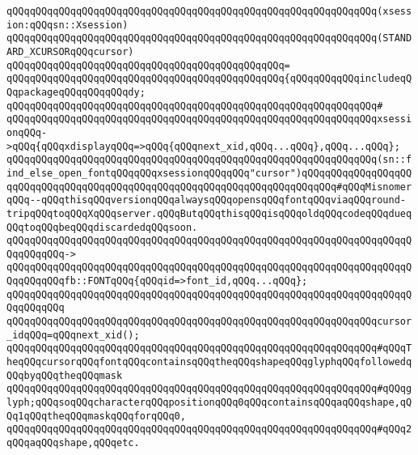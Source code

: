 \verb|qQQqqQQqqQQqqQQqqQQqqQQqqQQqqQQqqQQqqQQqqQQqqQQqqQQqqQQqqQQqqQQq(xsession:qQQqsn::Xsession)|\newline
\verb|qQQqqQQqqQQqqQQqqQQqqQQqqQQqqQQqqQQqqQQqqQQqqQQqqQQqqQQqqQQqqQQq(STANDARD_XCURSORqQQqcursor)|\newline
\verb|qQQqqQQqqQQqqQQqqQQqqQQqqQQqqQQqqQQqqQQqqQQqqQQq=|\newline
\verb|qQQqqQQqqQQqqQQqqQQqqQQqqQQqqQQqqQQqqQQqqQQqqQQq{qQQqqQQqqQQqincludeqQQqpackageqQQqqQQqqQQqdy;|\newline
\verb|qQQqqQQqqQQqqQQqqQQqqQQqqQQqqQQqqQQqqQQqqQQqqQQqqQQqqQQqqQQqqQQq#|\newline
\verb|qQQqqQQqqQQqqQQqqQQqqQQqqQQqqQQqqQQqqQQqqQQqqQQqqQQqqQQqqQQqqQQqxsessionqQQq->qQQq{qQQqxdisplayqQQq=>qQQq{qQQqnext_xid,qQQq...qQQq},qQQq...qQQq};|\newline
\newline
\verb|qQQqqQQqqQQqqQQqqQQqqQQqqQQqqQQqqQQqqQQqqQQqqQQqqQQqqQQqqQQqqQQq(sn::find_else_open_fontqQQqqQQqxsessionqQQqqQQq"cursor")qQQqqQQqqQQqqQQqqQQqqQQqqQQqqQQqqQQqqQQqqQQqqQQqqQQqqQQqqQQqqQQqqQQqqQQqqQQq#qQQqMisnomerqQQq--qQQqthisqQQqversionqQQqalwaysqQQqopensqQQqfontqQQqviaqQQqround-tripqQQqtoqQQqXqQQqserver.qQQqButqQQqthisqQQqisqQQqoldqQQqcodeqQQqdueqQQqtoqQQqbeqQQqdiscardedqQQqsoon.|\newline
\verb|qQQqqQQqqQQqqQQqqQQqqQQqqQQqqQQqqQQqqQQqqQQqqQQqqQQqqQQqqQQqqQQqqQQqqQQqqQQqqQQq->|\newline
\verb|qQQqqQQqqQQqqQQqqQQqqQQqqQQqqQQqqQQqqQQqqQQqqQQqqQQqqQQqqQQqqQQqqQQqqQQqqQQqqQQqfb::FONTqQQq{qQQqid=>font_id,qQQq...qQQq};|\newline
\verb|qQQqqQQqqQQqqQQqqQQqqQQqqQQqqQQqqQQqqQQqqQQqqQQqqQQqqQQqqQQqqQQqqQQqqQQqqQQqqQQq|\newline
\newline
\verb|qQQqqQQqqQQqqQQqqQQqqQQqqQQqqQQqqQQqqQQqqQQqqQQqqQQqqQQqqQQqqQQqcursor_idqQQq=qQQqnext_xid();|\newline
\newline
\verb|qQQqqQQqqQQqqQQqqQQqqQQqqQQqqQQqqQQqqQQqqQQqqQQqqQQqqQQqqQQqqQQq#qQQqTheqQQqcursorqQQqfontqQQqcontainsqQQqtheqQQqshapeqQQqglyphqQQqfollowedqQQqbyqQQqtheqQQqmask|\newline
\verb|qQQqqQQqqQQqqQQqqQQqqQQqqQQqqQQqqQQqqQQqqQQqqQQqqQQqqQQqqQQqqQQq#qQQqglyph;qQQqsoqQQqcharacterqQQqpositionqQQq0qQQqcontainsqQQqaqQQqshape,qQQq1qQQqtheqQQqmaskqQQqforqQQq0,|\newline
\verb|qQQqqQQqqQQqqQQqqQQqqQQqqQQqqQQqqQQqqQQqqQQqqQQqqQQqqQQqqQQqqQQq#qQQq2qQQqaqQQqshape,qQQqetc.|\newline
